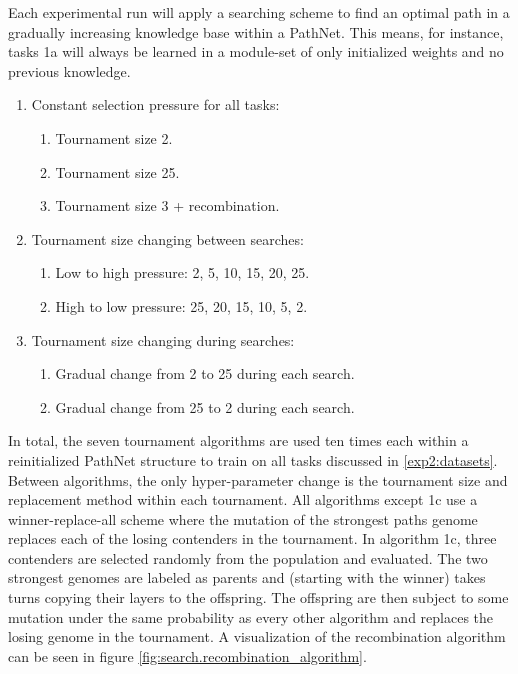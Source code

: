 Each experimental run will apply a searching scheme to find an optimal path in a gradually increasing knowledge base within a PathNet. This means, for instance, tasks 1a will always be learned in a module-set of only initialized weights and no previous knowledge. 
\begin{enumerate}
    \item Constant selection pressure for all tasks:
    \begin{enumerate}
        \item Tournament size 2.
        \item Tournament size 25.
        \item Tournament size 3 + recombination.
    \end{enumerate}
    \item Tournament size changing between searches:
    \begin{enumerate}
        \item Low to high pressure: 2, 5, 10, 15, 20, 25.
        \item High to low pressure: 25, 20, 15, 10, 5, 2.
    \end{enumerate}
    \item Tournament size changing during searches:
    \begin{enumerate}
        \item Gradual change from 2 to 25 during each search.
        \item Gradual change from 25 to 2 during each search.
    \end{enumerate}
\end{enumerate}
In total, the seven tournament algorithms are used ten times each within a reinitialized PathNet structure to train on all tasks discussed in \ref{exp2:datasets}. Between algorithms, the only hyper-parameter change is the tournament size and replacement method within each tournament. All algorithms except 1c use a winner-replace-all scheme where the mutation of the strongest paths genome replaces each of the losing contenders in the tournament. In algorithm 1c, three contenders are selected randomly from the population and evaluated. The two strongest genomes are labeled as parents and (starting with the winner) takes turns copying their layers to the offspring. The offspring are then subject to some mutation under the same probability as every other algorithm and replaces the losing genome in the tournament. A visualization of the recombination algorithm can be seen in figure \ref{fig:search.recombination_algorithm}.
